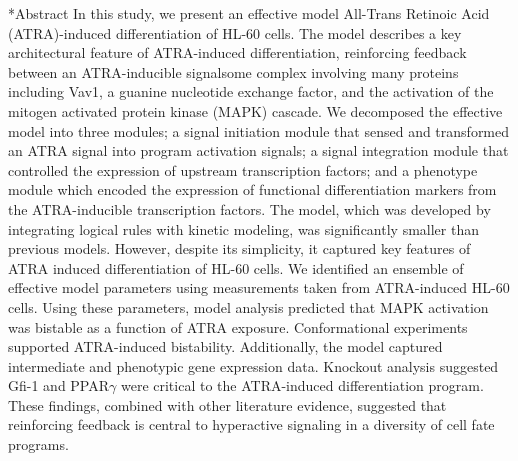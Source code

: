 \documentclass[12pt]{article}
\makeatletter
\renewcommand\section{\@startsection
	{subsection}{2}{0mm}
	{-0.2in}
	{0.05\baselineskip}
	{\normalfont\large\bfseries}}
\makeatother
\begin{document}
\section*{Abstract}
In this study, we present an effective model All-Trans Retinoic Acid (ATRA)-induced differentiation of HL-60 cells.
The model describes a key architectural feature of ATRA-induced differentiation,
reinforcing feedback between an ATRA-inducible signalsome complex involving many proteins including Vav1, a guanine nucleotide exchange factor,
and the activation of the mitogen activated protein kinase (MAPK) cascade.
We decomposed the effective model into three modules;
a signal initiation module that sensed and transformed an ATRA signal into program activation signals;
a signal integration module that controlled the expression of upstream transcription factors; and
a phenotype module which encoded the expression of functional differentiation markers from the ATRA-inducible transcription factors.
The model, which was developed by integrating logical rules with kinetic modeling, was significantly smaller than previous models.
However, despite its simplicity, it captured key features of ATRA induced differentiation of HL-60 cells.
We identified an ensemble of effective model parameters using measurements taken from ATRA-induced HL-60 cells.
Using these parameters, model analysis predicted that MAPK activation was bistable as a function of ATRA exposure.
Conformational experiments supported ATRA-induced bistability.
Additionally, the model captured intermediate and phenotypic gene expression data.
Knockout analysis suggested Gfi-1 and PPAR$\gamma$ were critical to the ATRA-induced differentiation program.
These findings, combined with other literature evidence, suggested that reinforcing feedback is central to hyperactive signaling in a diversity of cell fate programs.

\clearpage

\setcounter{page}{1}

\linenumbers

\end{document}

